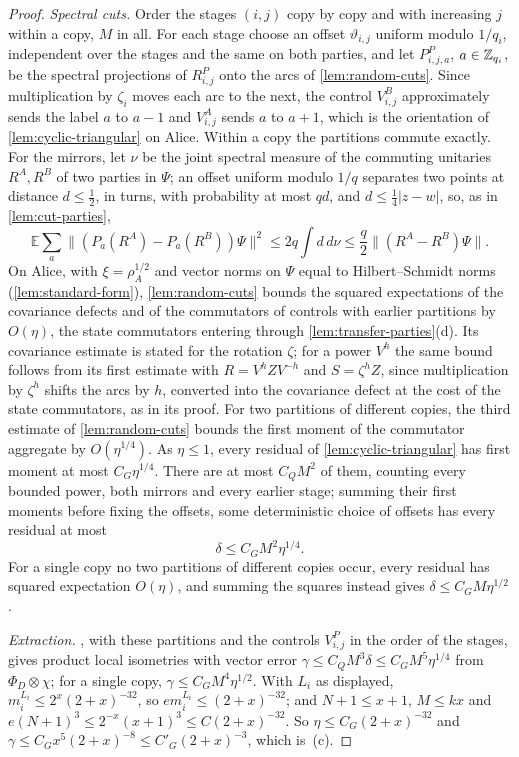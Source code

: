 \begin{proof}
\emph{Spectral cuts.} Order the stages $(i,j)$ copy by copy and with increasing $j$ within a copy, $M$ in all. For each stage choose an
offset $\vartheta_{i,j}$ uniform modulo $1/q_i$, independent over the stages and the same on both parties, and let $P^P_{i,j,a}$,
$a\in\mathbb Z_{q_i}$, be the spectral projections of $R^P_{i,j}$ onto the arcs of \cref{lem:random-cuts}. Since multiplication by $\zeta_i$ moves
each arc to the next, the control $V^B_{i,j}$ approximately sends the label $a$ to $a-1$ and $V^A_{i,j}$ sends $a$ to $a+1$, which is the
orientation of \cref{lem:cyclic-triangular} on Alice. Within a copy the partitions commute exactly. For the mirrors, let $\nu$ be the
joint spectral measure of the commuting unitaries $R^A,R^B$ of two parties in $\Psi$; an offset uniform modulo $1/q$ separates two points at
distance $d\le\frac12$, in turns, with probability at most $qd$, and $d\le\frac14|z-w|$, so, as in \cref{lem:cut-parties},
\[
\mathbb E\sum_a\|(P_a(R^A)-P_a(R^B))\Psi\|^2\le2q\int d\,d\nu\le\frac q2\|(R^A-R^B)\Psi\| .
\]
On Alice, with $\xi=\rho_A^{1/2}$ and vector norms on $\Psi$ equal to Hilbert--Schmidt norms (\cref{lem:standard-form}),
\cref{lem:random-cuts} bounds the squared expectations of the covariance defects and of the commutators of controls with earlier
partitions by $O(\eta)$, the state commutators entering through \cref{lem:transfer-parties}(d). Its covariance estimate is stated for
the rotation $\zeta$; for a power $V^h$ the same bound follows from its first estimate with $R=V^hZV^{-h}$ and $S=\zeta^hZ$, since
multiplication by $\zeta^h$ shifts the arcs by $h$, converted into the covariance defect at the cost of the state commutators, as in its
proof. For two partitions of different copies, the third estimate
of \cref{lem:random-cuts} bounds the first moment of the commutator aggregate by $O(\eta^{1/4})$. As $\eta\le1$, every residual of
\cref{lem:cyclic-triangular} has first moment at most $C_G\eta^{1/4}$. There are at most $C_QM^2$ of them, counting every bounded power,
both mirrors and every earlier stage; summing their first moments before fixing the offsets, some deterministic choice of offsets has
every residual at most
\[
\delta\le C_GM^2\eta^{1/4}.
\]
For a single copy no two partitions of different copies occur, every residual has squared expectation $O(\eta)$, and summing the squares
instead gives $\delta\le C_GM\eta^{1/2}$.

\emph{Extraction.} , with these partitions and the controls $V^P_{i,j}$ in the order of the stages, gives
product local isometries with vector error $\gamma\le C_QM^3\delta\le C_GM^5\eta^{1/4}$ from $\Phi_D\otimes\chi$; for a single copy,
$\gamma\le C_GM^4\eta^{1/2}$. With $L_i$ as displayed, $m_i^{L_i}\le2^x(2+x)^{-32}$, so $em_i^{L_i}\le(2+x)^{-32}$; and $N+1\le x+1$,
$M\le kx$ and $e(N+1)^3\le2^{-x}(x+1)^3\le C(2+x)^{-32}$. So $\eta\le C_G(2+x)^{-32}$ and $\gamma\le C_Gx^5(2+x)^{-8}\le C'_G(2+x)^{-3}$,
which is~(c).


\end{proof}

